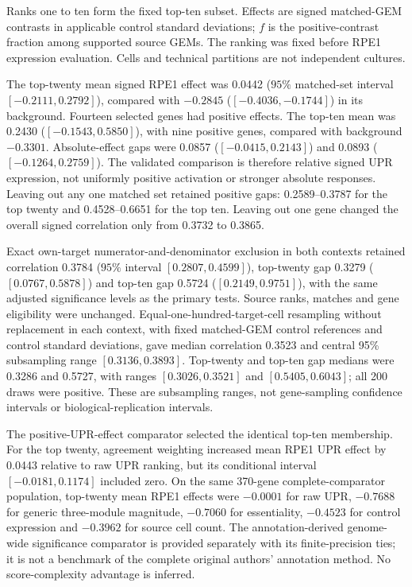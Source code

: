 \documentclass[a4paper,fleqn]{cas-sc}
\makeatletter
\DeclareRobustCommand{\rev}[1]{{\color{red}\def\@citecolor{black}\def\@linkcolor{red}\def\@urlcolor{red}#1}}
\makeatother
\begin{document}
\rev{Ranks one to ten form the fixed top-ten subset.} \rev{Effects are signed matched-GEM contrasts in applicable control standard deviations; $f$ is the positive-contrast fraction among supported source GEMs.} \rev{The ranking was fixed before RPE1 expression evaluation.} \rev{Cells and technical partitions are not independent cultures.}

\rev{The top-twenty mean signed RPE1 effect was 0.0442 ($95\%$ matched-set interval $[-0.2111,0.2792]$), compared with $-0.2845$ ($[-0.4036,-0.1744]$) in its background.} \rev{Fourteen selected genes had positive effects.} \rev{The top-ten mean was 0.2430 ($[-0.1543,0.5850]$), with nine positive genes, compared with background $-0.3301$.} \rev{Absolute-effect gaps were 0.0857 ($[-0.0415,0.2143]$) and 0.0893 ($[-0.1264,0.2759]$).} \rev{The validated comparison is therefore relative signed UPR expression, not uniformly positive activation or stronger absolute responses.} \rev{Leaving out any one matched set retained positive gaps: 0.2589--0.3787 for the top twenty and 0.4528--0.6651 for the top ten.} \rev{Leaving out one gene changed the overall signed correlation only from 0.3732 to 0.3865.}

\rev{Exact own-target numerator-and-denominator exclusion in both contexts retained correlation 0.3784 ($95\%$ interval $[0.2807,0.4599]$), top-twenty gap 0.3279 ($[0.0767,0.5878]$) and top-ten gap 0.5724 ($[0.2149,0.9751]$), with the same adjusted significance levels as the primary tests.} \rev{Source ranks, matches and gene eligibility were unchanged.} \rev{Equal-one-hundred-target-cell resampling without replacement in each context, with fixed matched-GEM control references and control standard deviations, gave median correlation 0.3523 and central 95\% subsampling range $[0.3136,0.3893]$.} \rev{Top-twenty and top-ten gap medians were 0.3286 and 0.5727, with ranges $[0.3026,0.3521]$ and $[0.5405,0.6043]$; all 200 draws were positive.} \rev{These are subsampling ranges, not gene-sampling confidence intervals or biological-replication intervals.}

\rev{The positive-UPR-effect comparator selected the identical top-ten membership.} \rev{For the top twenty, agreement weighting increased mean RPE1 UPR effect by 0.0443 relative to raw UPR ranking, but its conditional interval $[-0.0181,0.1174]$ included zero.} \rev{On the same 370-gene complete-comparator population, top-twenty mean RPE1 effects were $-0.0001$ for raw UPR, $-0.7688$ for generic three-module magnitude, $-0.7060$ for essentiality, $-0.4523$ for control expression and $-0.3962$ for source cell count.} \rev{The annotation-derived genome-wide significance comparator is provided separately with its finite-precision ties; it is not a benchmark of the complete original authors' annotation method.} \rev{No score-complexity advantage is inferred.}
\end{document}
